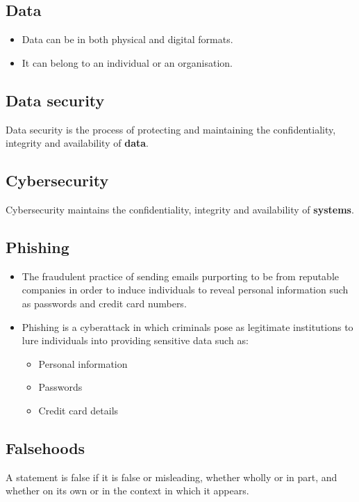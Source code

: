 \documentclass[11pt]{article}
\begin{document}
\subsection{Data}
\label{sec:org27c6759}
\begin{itemize}
\item Data can be in both physical and digital formats.
\item It can belong to an individual or an organisation.
\end{itemize}

\subsection{Data security}
\label{sec:org9271764}
Data security is the process of protecting and maintaining the confidentiality, integrity and availability of \textbf{data}.

\subsection{Cybersecurity}
\label{sec:org5e742eb}
Cybersecurity maintains the confidentiality, integrity and availability of \textbf{systems}.

\subsection{Phishing}
\label{sec:org6443a59}
\begin{itemize}
\item The fraudulent practice of sending emails purporting to be from reputable companies in order to induce individuals to reveal personal information such as passwords and credit card numbers.
\item Phishing is a cyberattack in which criminals pose as legitimate institutions to lure individuals into providing sensitive data such as:
\begin{itemize}
\item Personal information
\item Passwords
\item Credit card details
\end{itemize}
\end{itemize}

\subsection{Falsehoods}
\label{sec:org6288fd2}
A statement is false if it is false or misleading, whether wholly or in part, and whether on its own or in the context in which it appears.
\end{document}
